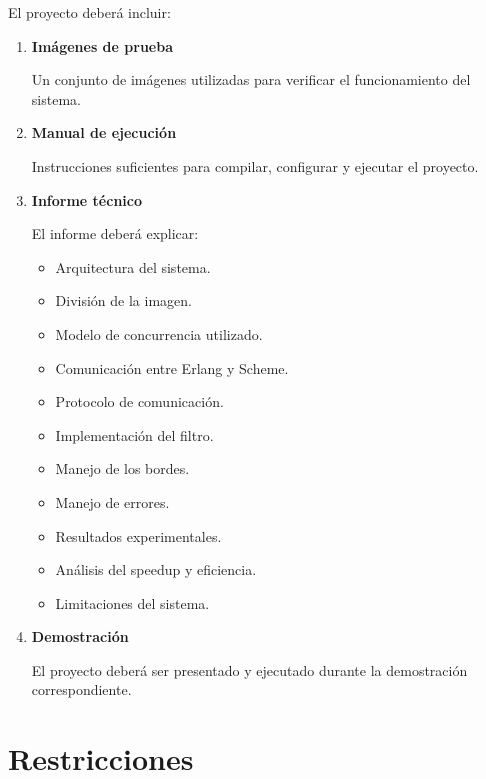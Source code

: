 \documentclass[11pt,a4paper]{article}
\begin{document}
El proyecto deberá incluir:

\begin{enumerate}

\item \textbf{Imágenes de prueba}

Un conjunto de imágenes utilizadas para verificar el funcionamiento
del sistema.

\item \textbf{Manual de ejecución}

Instrucciones suficientes para compilar, configurar y ejecutar el
proyecto.

\item \textbf{Informe técnico}

El informe deberá explicar:

\begin{itemize}
    \item Arquitectura del sistema.
    \item División de la imagen.
    \item Modelo de concurrencia utilizado.
    \item Comunicación entre Erlang y Scheme.
    \item Protocolo de comunicación.
    \item Implementación del filtro.
    \item Manejo de los bordes.
    \item Manejo de errores.
    \item Resultados experimentales.
    \item Análisis del speedup y eficiencia.
    \item Limitaciones del sistema.
\end{itemize}

\item \textbf{Demostración}

El proyecto deberá ser presentado y ejecutado durante la
demostración correspondiente.

\end{enumerate}

\section{Restricciones}
\end{document}
